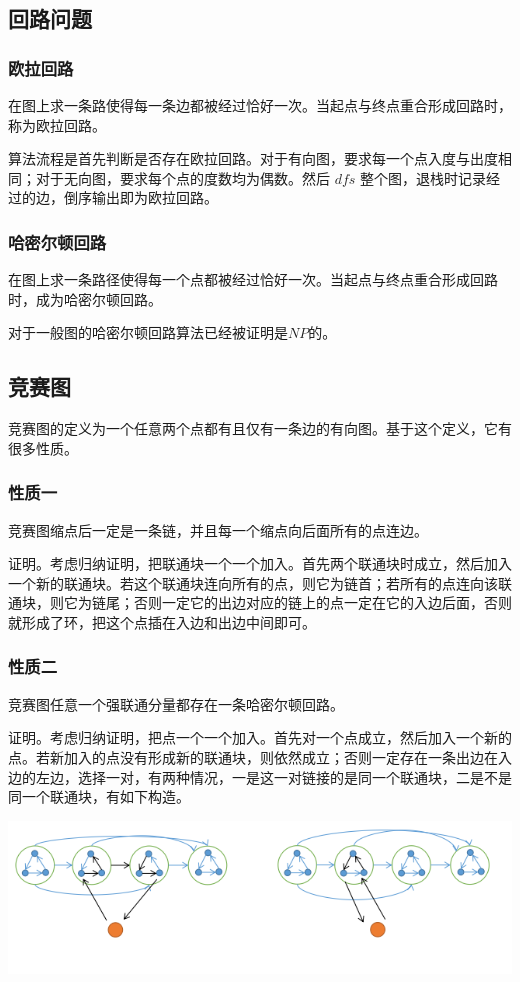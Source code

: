 \documentclass[UTF-8]{ctexart}
\begin{document}
				\subsection{回路问题}
				\subsubsection{欧拉回路}
				在图上求一条路使得每一条边都被经过恰好一次。当起点与终点重合形成回路时，称为欧拉回路。
				
				算法流程是首先判断是否存在欧拉回路。对于有向图，要求每一个点入度与出度相同；对于无向图，要求每个点的度数均为偶数。然后 $dfs$ 整个图，退栈时记录经过的边，倒序输出即为欧拉回路。
				\subsubsection{哈密尔顿回路}
				在图上求一条路径使得每一个点都被经过恰好一次。当起点与终点重合形成回路时，成为哈密尔顿回路。
				
				对于一般图的哈密尔顿回路算法已经被证明是$NP$的。
				\subsection{竞赛图}
				竞赛图的定义为一个任意两个点都有且仅有一条边的有向图。基于这个定义，它有很多性质。
				\subsubsection{性质一}
				竞赛图缩点后一定是一条链，并且每一个缩点向后面所有的点连边。
				
				证明。考虑归纳证明，把联通块一个一个加入。首先两个联通块时成立，然后加入一个新的联通块。若这个联通块连向所有的点，则它为链首；若所有的点连向该联通块，则它为链尾；否则一定它的出边对应的链上的点一定在它的入边后面，否则就形成了环，把这个点插在入边和出边中间即可。
				\subsubsection{性质二}
				竞赛图任意一个强联通分量都存在一条哈密尔顿回路。
				
				证明。考虑归纳证明，把点一个一个加入。首先对一个点成立，然后加入一个新的点。若新加入的点没有形成新的联通块，则依然成立；否则一定存在一条出边在入边的左边，选择一对，有两种情况，一是这一对链接的是同一个联通块，二是不是同一个联通块，有如下构造。
				\begin{center}
					\includegraphics[width=15cm]{file//hamiltonian1.png}
				\end{center}
\end{document}
